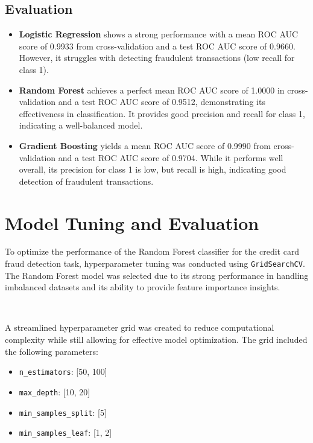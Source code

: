 \documentclass{article}
\begin{document}
\subsection{Evaluation}

\begin{itemize}
    \item \textbf{Logistic Regression} shows a strong performance with a mean ROC AUC score of 0.9933 from cross-validation and a test ROC AUC score of 0.9660. However, it struggles with detecting fraudulent transactions (low recall for class 1).
    \item \textbf{Random Forest} achieves a perfect mean ROC AUC score of 1.0000 in cross-validation and a test ROC AUC score of 0.9512, demonstrating its effectiveness in classification. It provides good precision and recall for class 1, indicating a well-balanced model.
    \item \textbf{Gradient Boosting} yields a mean ROC AUC score of 0.9990 from cross-validation and a test ROC AUC score of 0.9704. While it performs well overall, its precision for class 1 is low, but recall is high, indicating good detection of fraudulent transactions.
\end{itemize}

\section{Model Tuning and Evaluation}

To optimize the performance of the Random Forest classifier for the credit card fraud detection task, hyperparameter tuning was conducted using \texttt{GridSearchCV}. The Random Forest model was selected due to its strong performance in handling imbalanced datasets and its ability to provide feature importance insights.

\

\noindent
A streamlined hyperparameter grid was created to reduce computational complexity while still allowing for effective model optimization. The grid included the following parameters:

\begin{itemize}
    \item \texttt{n\_estimators}: [50, 100]
    \item \texttt{max\_depth}: [10, 20]
    \item \texttt{min\_samples\_split}: [5]
    \item \texttt{min\_samples\_leaf}: [1, 2]
\end{itemize}
\end{document}
